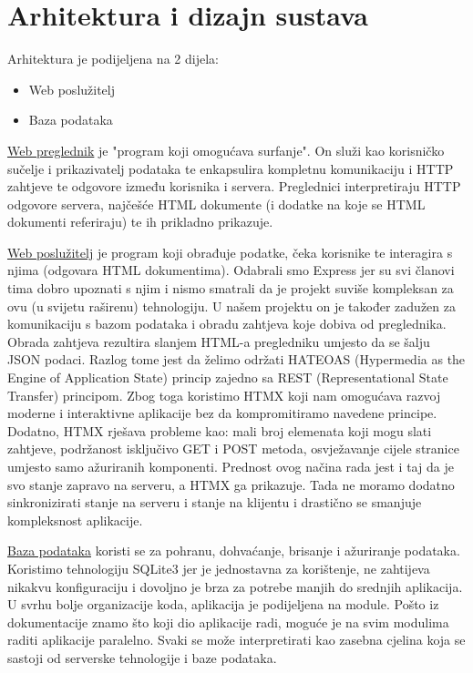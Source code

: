 \chapter{Arhitektura i dizajn sustava}

\noindent Arhitektura je podijeljena na 2 dijela:
\begin{itemize}
  \item Web poslužitelj
  \item Baza podataka
\end{itemize}

\underline{Web preglednik} je "program koji omogućava surfanje". On služi kao korisničko sučelje i prikazivatelj podataka te enkapsulira kompletnu komunikaciju i HTTP zahtjeve te odgovore između korisnika i servera. Preglednici interpretiraju HTTP odgovore servera, najčešće HTML dokumente (i dodatke na koje se HTML dokumenti referiraju) te ih prikladno prikazuje.\hfill \break

\underline{Web poslužitelj} je program koji obrađuje podatke, čeka korisnike te interagira s njima (odgovara HTML dokumentima). 
Odabrali smo Express jer su svi članovi tima dobro upoznati s njim i nismo smatrali da je projekt suviše kompleksan za ovu (u svijetu raširenu) tehnologiju. U našem projektu on je također zadužen za komunikaciju s bazom podataka i obradu zahtjeva koje dobiva od preglednika. Obrada zahtjeva rezultira slanjem HTML-a pregledniku umjesto da se šalju JSON podaci. Razlog tome jest da želimo održati HATEOAS (Hypermedia as the Engine of Application State) princip zajedno sa REST (Representational State Transfer) principom. Zbog toga koristimo HTMX koji nam omogućava razvoj moderne i interaktivne aplikacije bez da kompromitiramo navedene principe. Dodatno, HTMX rješava probleme kao: mali broj elemenata koji mogu slati zahtjeve, podržanost isključivo GET i POST metoda, osvježavanje cijele stranice umjesto samo ažuriranih komponenti. Prednost ovog načina rada jest i taj da je svo stanje zapravo na serveru, a HTMX ga prikazuje. Tada ne moramo dodatno sinkronizirati stanje na serveru i stanje na klijentu i  drastično se smanjuje kompleksnost aplikacije.\hfill \break

\underline{Baza podataka} koristi se za pohranu, dohvaćanje, brisanje i ažuriranje podataka. Koristimo tehnologiju SQLite3 jer je jednostavna za korištenje, ne zahtijeva nikakvu konfiguraciju i dovoljno je brza za potrebe manjih do srednjih aplikacija.\hfill \break
\eject
U svrhu bolje organizacije koda, aplikacija je podijeljena na module. Pošto iz dokumentacije znamo što koji dio aplikacije radi, moguće je na svim modulima raditi aplikacije paralelno. Svaki se može interpretirati kao zasebna cjelina koja se sastoji od serverske tehnologije i baze podataka.\hfill \break

